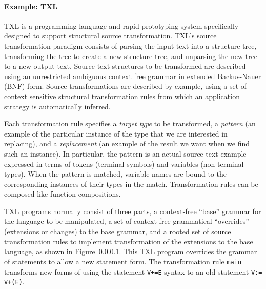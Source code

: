 \paragraph{\textbf{Example: TXL}} TXL is a programming language and rapid prototyping system specifically designed to support structural source transformation. TXL's source transformation paradigm consists of parsing the input text into a structure tree, transforming the tree to create a new structure tree, and unparsing the new tree to a new output text. Source text structures to be transformed are described using an unrestricted ambiguous context free grammar in extended Backus-Nauer (BNF) form. Source transformations are described by example, using a set of context sensitive structural transformation rules from which an application strategy is automatically inferred. 

Each transformation rule specifies a {\em target type} to be transformed, a {\em pattern} (an example of the particular instance of the type that we are interested in replacing), and a {\em replacement} (an example of the result we want when we find such an instance). In particular, the pattern is an actual source text example expressed in terms of tokens (terminal symbols) and variables (non-terminal types). When the pattern is matched, variable names are bound to the corresponding instances of their types in the match. Transformation rules can be composed like function compositions.  


TXL programs normally consist of three parts, a context-free “base” grammar for the language to be manipulated, a set of context-free grammatical “overrides” (extensions or changes) to the base grammar, and a rooted set of source transformation rules to implement transformation of the extensions to the base language, as shown in Figure~\ref{}. This TXL program overrides the grammar of statements to allow a new statement form. The transformation rule {\tt main} transforms new forms of using the statement {\tt V+=E} syntax to an old statement { \tt V:= V+(E)}. 

